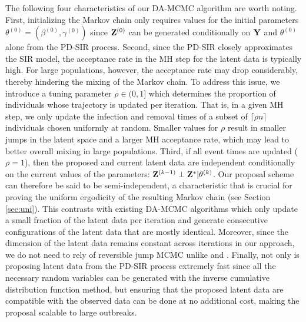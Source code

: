 \documentclass[11pt]{article}
\begin{document}
	The following four characteristics of our DA-MCMC algorithm are worth noting.
	First, initializing the Markov chain only requires values for the initial parameters $\theta^{(0)} = (\beta^{(0)}, \gamma^{(0)})$ since $\mathbf{Z}^{(0)}$ can be generated conditionally on $\mathbf{Y}$ and $\theta^{(0)}$ alone from the PD-SIR process.
	Second, since the PD-SIR closely approximates the SIR model, the acceptance rate in the MH step for the latent data is typically high. For large populations, however, the acceptance rate may drop considerably, thereby hindering the mixing of the Markov chain. To address this issue, we introduce a tuning parameter $\rho \in (0, 1]$ which determines the proportion of individuals whose trajectory is updated per iteration. That is, in a given MH step, we only update the infection and removal times of a subset of $\lceil\rho n\rceil$ individuals chosen uniformly at random.
	Smaller values for $\rho$ result in smaller jumps in the latent space and a larger MH acceptance rate, which may lead to better overall mixing in large populations.
	Third, if all event times are updated ($\rho = 1$), then the proposed and current latent data are independent conditionally on the current values of the parameters: $\mathbf{Z}^{(k-1)} \perp \mathbf{Z}^* | \theta^{(k)}$. Our proposal scheme can therefore be said to be semi-independent, a characteristic that is crucial for proving the uniform ergodicity of the resulting Markov chain (see Section \eqref{sec:uni}). This contrasts with existing DA-MCMC algorithms which only update a small fraction of the latent data per iteration and generate consecutive configurations of the latent data that are mostly identical. 
	Moreover, since the dimension of the latent data remains constant across iterations in our approach, we do not need to rely of reversible jump MCMC unlike \cite{Gibson.1998} and \cite{ONeill.1999}.
	Finally, not only is proposing latent data from the PD-SIR process extremely fast since all the necessary random variables can be generated with the inverse cumulative distribution function method, but ensuring that the proposed latent data are compatible with the observed data can be done at no additional cost, making the proposal scalable to large outbreaks.
	
\end{document}
